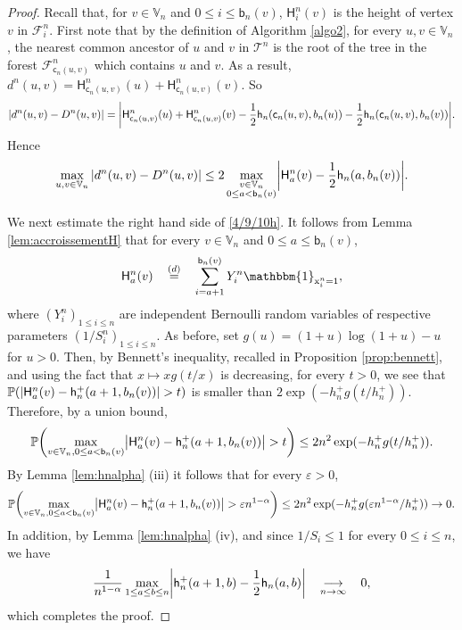 \documentclass[11pt]{article}
\theoremstyle{plain}
\theoremstyle{definition}
\theoremstyle{remark}
\renewcommand{\P}{{\mathbb{P}}} %
\newcommand{\1}{\mathbbm{1}} %
\newcommand{\proba}[1]{\mathbb{P}\left(#1\right)} %
\newcommand{\e}{\varepsilon} %
\newcommand{\T}{\mathcal{T}} %
\newcommand{\birth}{\mathsf{b}} %
\newcommand{\coal}{\mathsf{c}} %
\renewcommand{\H}{\mathsf{H}} %
\newcommand{\h}{\mathsf{h}} %
\newcommand{\X}{\mathrm x} %
\newcommand{\V}{\mathbb{V}} %
\newcommand{\dc}{D} %
\let\originalleft\left
\let\originalright\right
\renewcommand{\left}{\mathopen{}\mathclose\bgroup\originalleft}
\renewcommand{\right}{\aftergroup\egroup\originalright}
\begin{document}
\begin{proof}
Recall  that, for $v \in \mathbb{V}_{n}$ and $0 \leq i \leq \birth_{n}(v)$,  $\H^{n}_{i}(v)$ is the height of vertex $v$ in $\mathcal{F}^{n}_{i}$. 
First note that by the definition of Algorithm \ref{algo2},  for every $u,v\in \V_{n}$, the nearest common ancestor of $u$ and $v$ in $\T^{n}$ is the root of the tree in the forest $\mathcal{F}^{n}_{\coal_{n}(u,v)}$ which contains $u$ and $v$. As a result, $d^{n}(u,v)=\H^{n}_{\coal_{n}(u,v)}(u)+\H^{n}_{\coal_{n}(u,v)}(v)$.
So
\[ |d^{n}(u,v)-\dc^{n}(u,v)|= \left  | \H^{n}_{\coal_{n}(u,v)}(u)+\H^{n}_{\coal_{n}(u,v)}(v)- \frac{1}{2} \h_n(\coal_{n}(u,v),b_{n}(u))- \frac{1}{2} \h_n(\coal_{n}(u,v),b_{n}(v)) \right |. \]
Hence
\begin{equation}
\label{4/9/10h}
\max_{u,v\in \V_{n}} |d^{n}(u,v)-\dc^{n}(u,v)| \leq 2\max_{\substack{v\in \V_{n} \\ 0 \leq a<\birth_{n}(v)}} \left  |\H^{n}_{a}(v)- \frac{1}{2}  \h_{n}(a,b_{n}(v))\right |. 
\end{equation}

We next estimate the right hand side of \eqref{4/9/10h}. It follows from Lemma \ref{lem:accroissementH} that for every $v\in \V_{n}$ and $ 0 \leq a \leq \birth_{n}(v)$, 
\[ \H^{n}_a(v) \quad \mathop{=}^{(d)} \quad \sum_{i=a+1} ^{\birth_{n}(v)}  Y_{i}^{n} \1_{\X^{n}_i=1},\]
where $(Y_i^n)_{1 \leq i \leq n}$  are independent Bernoulli random variables of {respective} parameters $(1/S^n_i)_{1 \leq i \leq n}$.
As before, set $g(u)=(1+u)\log(1+u)-u$ for $u>0$. Then, by Bennett's inequality, recalled in Proposition \ref{prop:bennett}, and using the fact that $x \mapsto x g(t/x)$ is decreasing, for every $t>0$, we see that $\proba{ \left|  \H^{n}_a(v) -  \h^{+}_{n}(a+1,b_{n}(v)) \right|>t}$ {is smaller than} $2\exp(-h^{+}_n g(t/h^{+}_n))$.
Therefore, by a union bound,
\begin{equation}
\proba{\max_{{v\in \V_{n}, 0 \leq a<\birth_{n}(v)}} \left  |\H^{n}_{a}(v)-   \h^{+}_{n}(a+1,b_{n}(v))\right |>t}\leq 2n^2\exp(-h^{+}_n g(t/h^{+}_n)).
\label{4/9/14h}
\end{equation}
By Lemma \ref{lem:hnalpha} (iii)  it follows that  for every $\e>0$,
\[ \P\left (\max_{v\in \V_{n}, 0 \leq a<\birth_{n}(v)} \left  |\H^{n}_{a}(v)- \h^{+}_{n}(a+1,b_{n}(v)) \right |> \e n^{1-\alpha} \right )\leq 2n^2\exp(-h^{+}_n g(\e n^{1-\alpha}/h^{+}_n))\to 0.\] 
{In addition}, by Lemma \ref{lem:hnalpha} (iv), and since $ {1}/{S_{i}} \leq 1$ for every $0 \leq i \leq n$, we have
\[
\frac{1}{n^{1-\alpha}} \max_{1 \leq a \leq b \leq n} \left| \h^{+}_n(a+1,b)- \frac{1}{2} \h_n(a,b) \right|  \quad \mathop{\longrightarrow}_{n \rightarrow \infty} \quad 0,
\]
which completes the proof.
\end{proof}
\end{document}
